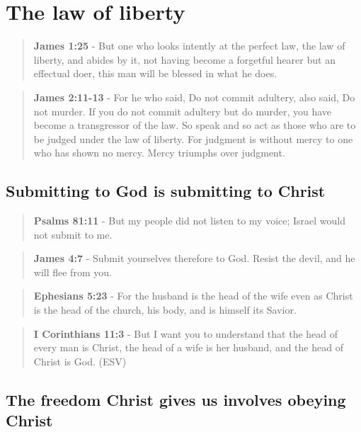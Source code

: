 \documentclass[11pt]{article}
\begin{document}
\section{The law of liberty}
\label{sec:orgdf94412}
\begin{quote}
\textbf{James 1:25} - But one who looks intently at the perfect law, the law of liberty, and abides by it, not having become a forgetful hearer but an effectual doer, this man will be blessed in what he does.
\end{quote}

\begin{quote}
\textbf{James 2:11-13} - For he who said, Do not commit adultery, also said, Do not murder. If you do not commit adultery but do murder, you have become a transgressor of the law.  So speak and so act as those who are to be judged under the law of liberty.  For judgment is without mercy to one who has shown no mercy. Mercy triumphs over judgment.
\end{quote}

\subsection{Submitting to God is submitting to Christ}
\label{sec:orgba9d9d1}
\begin{quote}
\textbf{Psalms 81:11} - But my people did not listen to my voice; Israel would not submit to me.
\end{quote}

\begin{quote}
\textbf{James 4:7} - Submit yourselves therefore to God. Resist the devil, and he will flee from you.
\end{quote}

\begin{quote}
\textbf{Ephesians 5:23} - For the husband is the head of the wife even as Christ is the head of the church, his body, and is himself its Savior.
\end{quote}

\begin{quote}
\textbf{I Corinthians 11:3} - But I want you to understand that the head of every man is Christ, the head of a wife is her husband, and the head of Christ is God. (ESV)
\end{quote}

\subsection{The freedom Christ gives us involves obeying Christ}
\label{sec:org55eacc0}
\end{document}
